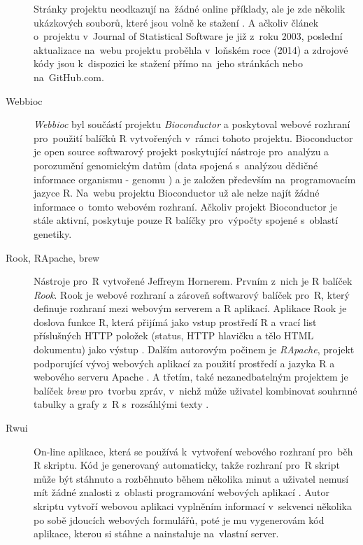 \documentclass[thesis=B,czech]{FITthesis}[2012/06/26]
\begin{document}
\begin{description}
Stránky projektu neodkazují na~žádné online příklady, ale je zde několik ukázkových souborů, které jsou volně ke stažení \cite{CGIwithR}. A ačkoliv článek o~projektu v~Journal of Statistical Software je již z~roku 2003, poslední aktualizace na~webu projektu proběhla v~loňském roce (2014) a zdrojové kódy jsou k~dispozici ke stažení přímo na~jeho stránkách nebo na~GitHub.com. 

\item[Webbioc] \begin{sloppypar}\textit{Webbioc} byl součástí projektu \textit{Bioconductor} a poskytoval webové rozhraní pro~použití balíčků R vytvořených v~rámci tohoto projektu. Bioconductor je open source softwarový projekt poskytující nástroje pro~analýzu a porozumění genomickým datům (data spojená s~analýzou dědičné informace organismu - genomu \cite{slovnik}) a je založen především na~programovacím jazyce R. Na~webu projektu Bioconductor už ale nelze najít žádné informace o~tomto webovém rozhraní. Ačkoliv projekt Bioconductor je stále aktivní, poskytuje pouze R balíčky pro~výpočty spojené s~oblastí genetiky. \end{sloppypar}

\item[Rook, RApache, brew] \begin{sloppypar}Nástroje pro~R vytvořené Jeffreym Hornerem. Prvním z~nich je R balíček \textit{Rook}. Rook je webové rozhraní a zároveň softwarový balíček pro~R, který definuje rozhraní mezi webovým serverem a R aplikací. Aplikace Rook je doslova funkce R, která přijímá jako vstup prostředí R a vrací list příslušných HTTP položek (status, HTTP hlavičku a tělo HTML dokumentu) jako výstup \cite{Rook}.  Dalším autorovým počinem je \textit{RApache}, projekt podporující vývoj webových aplikací za použití prostředí a jazyka R a webového serveru Apache \cite{RApache}. A třetím, také nezanedbatelným projektem je balíček \textit{brew} pro~tvorbu zpráv, v~nichž může uživatel kombinovat souhrnné tabulky a grafy z~R s~rozsáhlými texty \cite{brew}.\end{sloppypar}

\item[Rwui] \begin{sloppypar}On-line aplikace, která se používá k~vytvoření webového rozhraní pro~běh R skriptu. Kód je generovaný automaticky, takže rozhraní pro~R skript může být stáhnuto a rozběhnuto během několika minut a uživatel nemusí mít žádné znalosti z~oblasti programování webových aplikací \cite{Rwui}. Autor skriptu vytvoří webovou aplikaci vyplněním informací v~sekvenci několika po sobě jdoucích webových formulářů, poté je mu vygenerovám kód aplikace, kterou si stáhne a nainstaluje na~vlastní server.\end{sloppypar}


\end{description}
\end{document}
